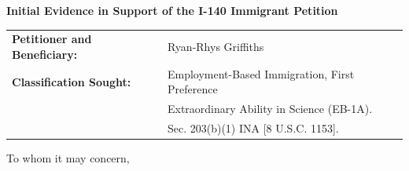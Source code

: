 \documentclass[11pt]{article}
\begin{document}
\pagebreak
\sloppy
\vspace{4em}

\begin{center}
 \Large{\textbf{Initial Evidence in Support of the I-140 Immigrant Petition}}
\end{center}

\vspace{4em}

\begin{tabular}{ll}
\textbf{Petitioner and Beneficiary:} & Ryan-Rhys Griffiths\\
\textbf{Classification Sought:} & Employment-Based Immigration, First Preference\\
& Extraordinary Ability in Science (EB-1A).\\
& Sec. 203(b)(1) INA [8 U.S.C. 1153].\\
\end{tabular}

\vspace{2em}

To whom it may concern,

\vspace{2em}

\newcommand{\fie}{Machine Learning and the Natural Sciences}
\newcommand{\dr}{Dr. Griffiths }
\newcommand{\drs}{Dr. Griffiths's }

\newcommand{\qu}[1]{\say{\emph{#1}}}

\newcommand{\dg}{(Prof. XYZ, Professor of XYZ, University of XYZ)\\}
\newcommand{\bc}{(Prof. XYZ, Professor of XYZ, University of XYZ)\\}
\newcommand{\pl}{(Prof. XYZ, Professor of XYZ, University of XYZ)\\}
\newcommand{\bw}{(Prof. XYZ, Professor of XYZ, University of XYZ)\\\\}
\newcommand{\sk}{Prof. XYZ, Professor of XYZ, University of XYZ)\\}
\newcommand{\ag}{Prof. XYZ, Professor of XYZ, University of XYZ)\\}
\end{document}
